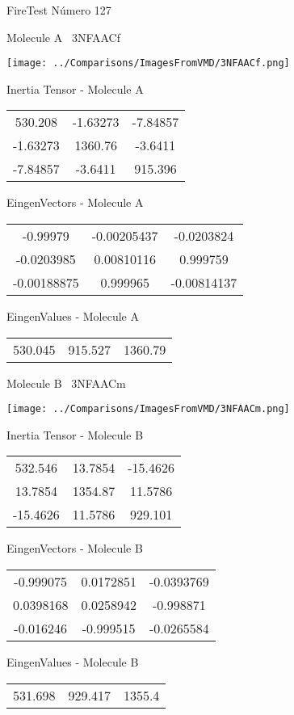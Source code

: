 \vtab[-3cm]
\begin{center}
{\large FireTest \tab Número 127}
\end{center}
\begin{multicols}{2}
\begin{center}

Molecule A \
3NFAACf

\texttt{[image: ../Comparisons/ImagesFromVMD/3NFAACf.png]}

Inertia Tensor - Molecule A \\
\begin{tabular}{|c c c|}
530.208	 & 	-1.63273	 & 	-7.84857	 \\
-1.63273	 & 	1360.76	 & 	-3.6411	 \\
-7.84857	 & 	-3.6411	 & 	915.396
\end{tabular}

\vtab
 EingenVectors - Molecule A     \\
\begin{tabular}{|c c c|}
-0.99979	 & 	-0.00205437	 & 	-0.0203824	 \\
-0.0203985	 & 	0.00810116	 & 	0.999759	 \\
-0.00188875	 & 	0.999965	 & 	-0.00814137
\end{tabular}

\vtab
 EingenValues - Molecule A     \\
\begin{tabular}{|c c c|}
530.045	 & 	915.527	 & 	1360.79	 \\
\end{tabular}
\columnbreak

Molecule B \
3NFAACm

\texttt{[image: ../Comparisons/ImagesFromVMD/3NFAACm.png]}

Inertia Tensor - Molecule B \\
\begin{tabular}{|c c c|}
532.546	 & 	13.7854	 & 	-15.4626	 \\
13.7854	 & 	1354.87	 & 	11.5786	 \\
-15.4626	 & 	11.5786	 & 	929.101
\end{tabular}

\vtab
 EingenVectors - Molecule B     \\
\begin{tabular}{|c c c|}
-0.999075	 & 	0.0172851	 & 	-0.0393769	 \\
0.0398168	 & 	0.0258942	 & 	-0.998871	 \\
-0.016246	 & 	-0.999515	 & 	-0.0265584
\end{tabular}

\vtab
 EingenValues - Molecule B     \\
\begin{tabular}{|c c c|}
531.698	 & 	929.417	 & 	1355.4	 \\
\end{tabular}

\end{center}
\end{multicols}

